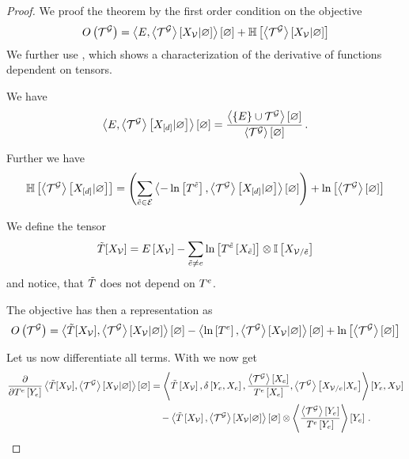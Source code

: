 \begin{proof}%
    We proof the theorem by the first order condition on the objective
    \begin{align*}
        \objof{\extnet} = \sbcontraction{\energytensor,\extnetdist} + \sentropyof{\extnetdist}
    \end{align*}
    We further use , which shows a characterization of the derivative of functions dependent on tensors.

    We have %
    \begin{align*}
        \sbcontraction{\energytensor,\normationof{\extnet}{\shortcatvariables}}
        =  \frac{
            \contraction{\{\energytensor\}\cup\extnet}
        }{
            \contraction{\extnet}
        } \, .
    \end{align*}

    Further we have
    \begin{align*}
        \sentropyof{\normationof{\extnet}{\shortcatvariables}}
        = \left(\sum_{\secedge\in\edges} \contraction{-\lnof{\hypercoreof{\secedge}},\normationof{\extnet}{\shortcatvariables}} \right)
        + \lnof{\contraction{\extnet}}
    \end{align*}

    We define the tensor
    \[ \sechypercore[\catvariableof{\nodes}] = \energytensorat{\catvariableof{\nodes}}
    - \sum_{\secedge\neq\edge} \lnof{\hypercoreofat{\secedge}{\catvariableof{\secedge}}} \otimes \onesat{\catvariableof{\nodes/\secedge}} \]
    and notice, that $\sechypercore$ does not depend on $\hypercoreof{\edge}$.

    The objective has then a representation as
    \begin{align*}
        \objof{\extnet} = \sbcontraction{\sechypercore[\catvariableof{\nodes}], \extnetdist} - \sbcontraction{ \lnof{\hypercoreof{\edge}}, \extnetdist} +  \lnof{\contraction{\extnet}}
    \end{align*}

    Let us now differentiate all terms.
    With  we now get
    \begin{align*}
        \difwrt{\hypercoreofat{\edge}{\seccatvariableof{\edge}}} \sbcontraction{\sechypercore[\catvariableof{\nodes}], \extnetdist}
        & = \sbcontractionof{\sechypercoreat{\nodevariables},
            \identityat{\seccatvariableof{\edge},\edgevariables},
            \frac{\contractionof{\extnet}{\edgevariables}}{\hypercoreofat{\edge}{\edgevariables}},
            \normationofwrt{\extnet}{\catvariableof{\nodes/\edge}}{\edgevariables} }{\seccatvariableof{\edge},\nodevariables} \\
        & \quad -  \contraction{\sechypercoreat{\nodevariables},\extnetdist}
        \otimes \sbcontractionof{\frac{\contractionof{\extnet}{\seccatvariableof{\edge}}}{\hypercoreofat{\edge}{\seccatvariableof{\edge}}}
        }{\seccatvariableof{\edge}} \, .
    \end{align*}


\end{proof}
